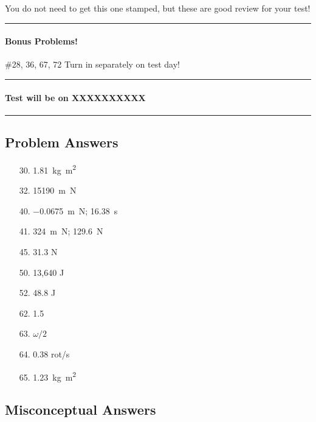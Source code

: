 \documentclass[10pt]{exam}
\begin{document}
{\sc You do not need to get this one stamped,
but these are good review for your test!}

\vspace{1em}
\hrule


\paragraph{Bonus Problems!} \#28, 36, 67, 72
\dotfill Turn in separately on test day!

\vspace{1em}
\hrule



\paragraph{Test will be on XXXXXXXXXX} \hfill

\vspace{1em}

\hrule

\subsection*{Problem Answers}

\begin{multicols}{3}

  \begin{itemize}[noitemsep]
    \item[30.]  \SI{1.81}{\kilo\gram \meter^2}
    \item[32.]  \SI{15190}{\meter\newton}
    \item[40.]  
      \SI{-0.0675}{\meter\newton}; \SI{16.38}{\second}
    \item[41.]  
      \SI{324}{\meter\newton}; \SI{129.6}{\newton}
    \item[45.]  31.3 N
    \item[50.]  13,640 J
    \item[52.]  48.8 J
    \item[62.]  1.5
    \item[63.]  $\omega/2$
    \item[64.]  0.38 rot/s
    \item[65.]  \SI{1.23}{\kilo\gram\meter^2}
  \end{itemize}
  
\end{multicols}

\subsection*{Misconceptual Answers}
\end{document}
